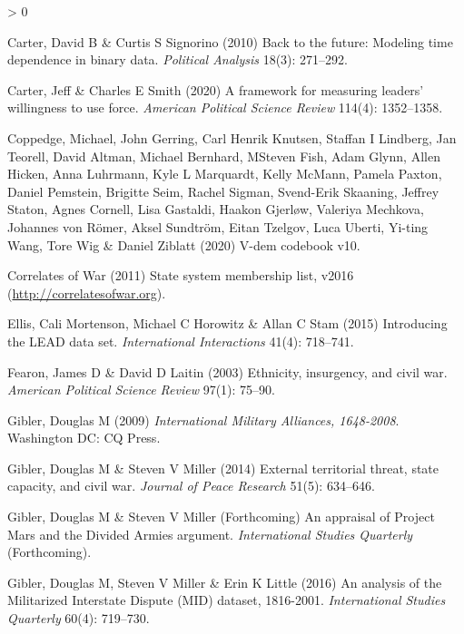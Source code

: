 \documentclass[
  11pt,
]{article}
\newlength{\cslhangindent}
\newenvironment{CSLReferences}[2] %
 {%
  \setlength{\parindent}{0pt}
  \ifodd #1 \everypar{\setlength{\hangindent}{\cslhangindent}}\ignorespaces\fi
  \ifnum #2 > 0
  \setlength{\parskip}{#2\baselineskip}
  \fi
 }%
 {}
\begin{document}
\begin{CSLReferences}{1}{0}
\leavevmode\hypertarget{ref-cartersignorino2010bf}{}%
Carter, David B \& Curtis S Signorino (2010) Back to the future: Modeling time dependence in binary data. \emph{Political Analysis} 18(3): 271--292.

\leavevmode\hypertarget{ref-cartersmith2020fml}{}%
Carter, Jeff \& Charles E Smith (2020) A framework for measuring leaders' willingness to use force. \emph{American Political Science Review} 114(4): 1352--1358.

\leavevmode\hypertarget{ref-coppedgeetal2020vdem}{}%
Coppedge, Michael, John Gerring, Carl Henrik Knutsen, Staffan I Lindberg, Jan Teorell, David Altman, Michael Bernhard, MSteven Fish, Adam Glynn, Allen Hicken, Anna Luhrmann, Kyle L Marquardt, Kelly McMann, Pamela Paxton, Daniel Pemstein, Brigitte Seim, Rachel Sigman, Svend-Erik Skaaning, Jeffrey Staton, Agnes Cornell, Lisa Gastaldi, Haakon Gjerløw, Valeriya Mechkova, Johannes von Römer, Aksel Sundtröm, Eitan Tzelgov, Luca Uberti, Yi-ting Wang, Tore Wig \& Daniel Ziblatt (2020) V-dem codebook v10.

\leavevmode\hypertarget{ref-cowstates2016}{}%
Correlates of War (2011) State system membership list, v2016 (\url{http://correlatesofwar.org}).

\leavevmode\hypertarget{ref-ellisetal2015lead}{}%
Ellis, Cali Mortenson, Michael C Horowitz \& Allan C Stam (2015) Introducing the {LEAD} data set. \emph{International Interactions} 41(4): 718--741.

\leavevmode\hypertarget{ref-fearonlaitin2003eicw}{}%
Fearon, James D \& David D Laitin (2003) Ethnicity, insurgency, and civil war. \emph{American Political Science Review} 97(1): 75--90.

\leavevmode\hypertarget{ref-gibler2009ima}{}%
Gibler, Douglas M (2009) \emph{International Military Alliances, 1648-2008}. Washington DC: CQ Press.

\leavevmode\hypertarget{ref-giblermiller2014etts}{}%
Gibler, Douglas M \& Steven V Miller (2014) External territorial threat, state capacity, and civil war. \emph{Journal of Peace Research} 51(5): 634--646.

\leavevmode\hypertarget{ref-giblermiller2021apm}{}%
Gibler, Douglas M \& Steven V Miller (Forthcoming) An appraisal of {P}roject {M}ars and the {D}ivided {A}rmies argument. \emph{International Studies Quarterly} (Forthcoming).

\leavevmode\hypertarget{ref-gibleretal2016amid}{}%
Gibler, Douglas M, Steven V Miller \& Erin K Little (2016) An analysis of the {M}ilitarized {I}nterstate {D}ispute {(MID)} dataset, 1816-2001. \emph{International Studies Quarterly} 60(4): 719--730.


\end{CSLReferences}
\end{document}
